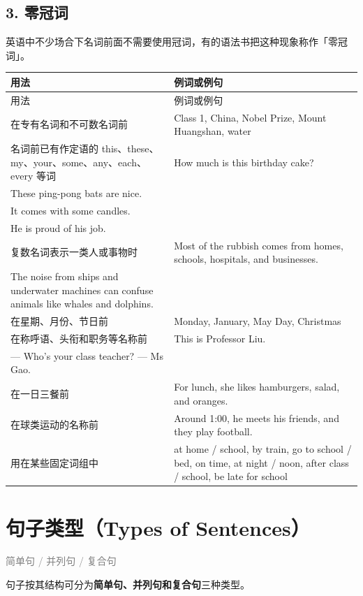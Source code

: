 \documentclass[11pt,a4paper]{ctexart}
\begin{document}
\subsection*{3. 零冠词}

英语中不少场合下名词前面不需要使用冠词，有的语法书把这种现象称作「零冠词」。

{\footnotesize
\begin{longtable}{p{6.70cm}p{6.70cm}}
\hline
用法 & 例词或例句 \\
\hline
\endfirsthead
\hline
用法 & 例词或例句 \\
\hline
\endhead
\hline
\endfoot
在专有名词和不可数名词前 & Class 1, China, Nobel Prize, Mount Huangshan, water \\
名词前已有作定语的 this、these、my、your、some、any、each、every 等词 & How much is this birthday cake?\\ These ping-pong bats are nice.\\ It comes with some candles.\\ He is proud of his job. \\
复数名词表示一类人或事物时 & Most of the rubbish comes from homes, schools, hospitals, and businesses.\\ The noise from ships and underwater machines can confuse animals like whales and dolphins. \\
在星期、月份、节日前 & Monday, January, May Day, Christmas \\
在称呼语、头衔和职务等名称前 & This is Professor Liu.\\ — Who’s your class teacher? — Ms Gao. \\
在一日三餐前 & For lunch, she likes hamburgers, salad, and oranges. \\
在球类运动的名称前 & Around 1:00, he meets his friends, and they play football. \\
用在某些固定词组中 & at home / school, by train, go to school / bed, on time, at night / noon, after class / school, be late for school \\
\end{longtable}
}

\section{句子类型（Types of Sentences）}
\noindent\textcolor{gray}{简单句 / 并列句 / 复合句}\par\smallskip
句子按其结构可分为\textbf{简单句、并列句和复合句}三种类型。
\end{document}
